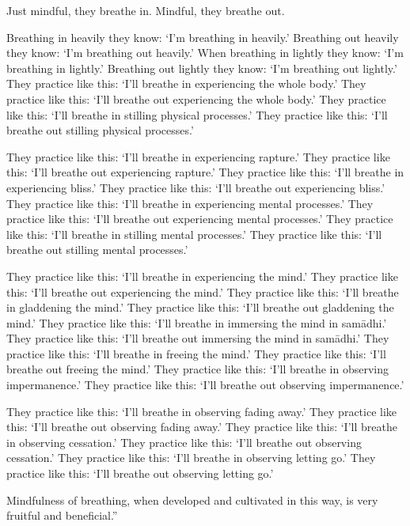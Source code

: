 \documentclass[12pt,openany]{book}%
\begin{document}
Just mindful, they breathe in. Mindful, they breathe out. 

Breathing in heavily they know: ‘I’m breathing in heavily.’ Breathing out heavily they know: ‘I’m breathing out heavily.’ When breathing in lightly they know: ‘I’m breathing in lightly.’ Breathing out lightly they know: ‘I’m breathing out lightly.’ They practice like this: ‘I’ll breathe in experiencing the whole body.’ They practice like this: ‘I’ll breathe out experiencing the whole body.’ They practice like this: ‘I’ll breathe in stilling physical processes.’ They practice like this: ‘I’ll breathe out stilling physical processes.’ 

They practice like this: ‘I’ll breathe in experiencing rapture.’ They practice like this: ‘I’ll breathe out experiencing rapture.’ They practice like this: ‘I’ll breathe in experiencing bliss.’ They practice like this: ‘I’ll breathe out experiencing bliss.’ They practice like this: ‘I’ll breathe in experiencing mental processes.’ They practice like this: ‘I’ll breathe out experiencing mental processes.’ They practice like this: ‘I’ll breathe in stilling mental processes.’ They practice like this: ‘I’ll breathe out stilling mental processes.’ 

They practice like this: ‘I’ll breathe in experiencing the mind.’ They practice like this: ‘I’ll breathe out experiencing the mind.’ They practice like this: ‘I’ll breathe in gladdening the mind.’ They practice like this: ‘I’ll breathe out gladdening the mind.’ They practice like this: ‘I’ll breathe in immersing the mind in \textsanskrit{samādhi}.’ They practice like this: ‘I’ll breathe out immersing the mind in \textsanskrit{samādhi}.’ They practice like this: ‘I’ll breathe in freeing the mind.’ They practice like this: ‘I’ll breathe out freeing the mind.’ They practice like this: ‘I’ll breathe in observing impermanence.’ They practice like this: ‘I’ll breathe out observing impermanence.’ 

They practice like this: ‘I’ll breathe in observing fading away.’ They practice like this: ‘I’ll breathe out observing fading away.’ They practice like this: ‘I’ll breathe in observing cessation.’ They practice like this: ‘I’ll breathe out observing cessation.’ They practice like this: ‘I’ll breathe in observing letting go.’ They practice like this: ‘I’ll breathe out observing letting go.’ 

Mindfulness of breathing, when developed and cultivated in this way, is very fruitful and beneficial.” 
\end{document}
